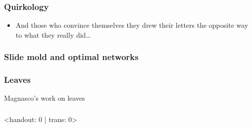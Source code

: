 \begin{frame}
  \frametitle{Quirkology}

  \begin{itemize}
  \item<1->
    And those who convince themselves
    they drew their letters the opposite way
    to what they really did\ldots

    \bigskip

  \end{itemize}

\end{frame}


\begin{frame}
  \frametitle{Slide mold and optimal networks}

\end{frame}

\begin{frame}
  \frametitle{Leaves}

  Magnasco's work on leaves

\end{frame}

\begin{frame}
  \frametitle{}

\end{frame}

\begin{frame}<handout: 0 | trans: 0>


\end{frame}




